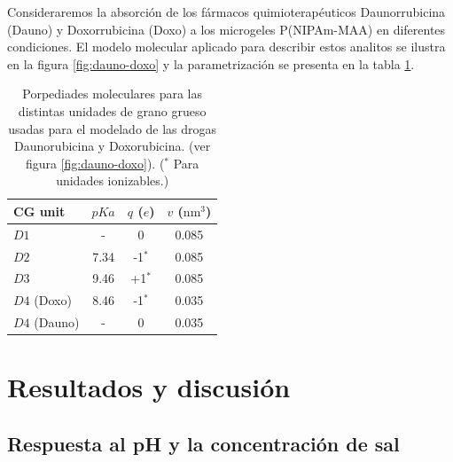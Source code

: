 Consideraremos la absorci\'on de los f\'armacos quimioterap\'euticos Daunorrubicina (Dauno) y Doxorrubicina (Doxo) a los microgeles P(NIPAm-MAA) en diferentes condiciones.
El modelo molecular aplicado para describir estos analitos se ilustra en la figura \ref{fig:dauno-doxo} y la parametrizaci\'on se presenta en la tabla \ref{table:drugs}.\addcite[PerezChavez2020]

\begin{table}
\centering
\begin{tabular}{|lccc|}
    \hline
    {CG unit} & {$pKa$} & {$q$ ($e$)} & {$v$ ($\text{nm}^3$)} \\
      \hline
$D1$ & - & 0 & 0.085\\
$D2$ & 7.34 & -1$^\ast$ & 0.085\\
$D3$ & 9.46 & +1$^\ast$ & 0.085\\ 
$D4$ (Doxo) & 8.46 & -1$^\ast$ & 0.035\\
$D4$ (Dauno) & - & 0 & 0.035 \\
    \hline
  \end{tabular}
 \caption{Porpediades moleculares para las distintas unidades de grano grueso usadas para el modelado de las drogas Daunorubicina y Doxorubicina. (ver figura \ref{fig:dauno-doxo}).
\footnotesize ($^\ast$ Para unidades ionizables.)}
\label{table:drugs} 
\end{table}




\section{Resultados y discusi\'on}



\subsection{Respuesta al pH y la concentraci\'on de sal}\label{sec:pH_salt}


